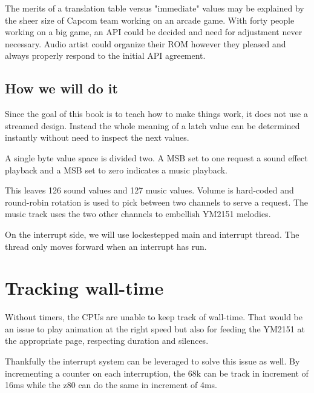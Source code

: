 The merits of a translation table versus "immediate" values may be explained by the sheer size of Capcom team working on an arcade game. With forty people working on a big game, an API could be decided and need for adjustment never necessary. Audio artist could organize their ROM however they pleased and always properly respond to the initial API agreement.


\subsection{How we will do it}

Since the goal of this book is to teach how to make things work, it does not use a streamed design. Instead the whole meaning of a latch value can be determined instantly without need to inspect the next values.

A single byte value space is divided two. A MSB set to one  request a sound effect playback and a MSB set to zero  indicates a music playback. 

This leaves 126 sound values and 127 music values. Volume is hard-coded and round-robin rotation is used to pick between two channels to serve a request. The music track uses the two other channels to embellish YM2151 melodies. 

On the interrupt side, we will use lockestepped main and interrupt thread. The  thread only moves forward when an interrupt has run.

\pagebreak



\section{Tracking wall-time}

Without timers, the CPUs are unable to keep track of wall-time. That would be an issue to play animation at the right speed but also for feeding the YM2151 at the appropriate page, respecting duration and silences. 

Thankfully the interrupt system can be leveraged to solve this issue as well. By incrementing a counter on each interruption, the 68k can be track in increment of 16ms while the z80 can do the same in increment of 4ms.




